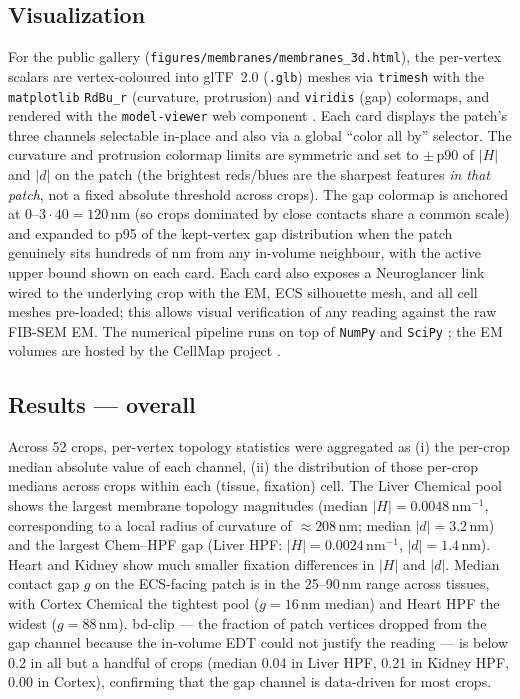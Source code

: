 \subsection*{Visualization}
For the public gallery (\texttt{figures/membranes/membranes\_3d.html}),
the per-vertex scalars are vertex-coloured into glTF~2.0 (\texttt{.glb})
meshes via \texttt{trimesh} \cite{DawsonHaggerty2019} with the
\texttt{matplotlib} \texttt{RdBu\_r} (curvature, protrusion) and
\texttt{viridis} (gap) colormaps, and rendered with the
\texttt{model-viewer} web component \cite{ModelViewer}. Each card displays the
patch's three channels selectable in-place and also via a global
``color all by'' selector. The curvature and protrusion colormap
limits are symmetric and set to $\pm$\,p90 of $|H|$ and $|d|$ on the
patch (the brightest reds/blues are the sharpest features
\emph{in that patch}, not a fixed absolute threshold across crops).
The gap colormap is anchored at 0--$3 \cdot 40 = 120$\,nm (so crops
dominated by close contacts share a common scale) and expanded to
p95 of the kept-vertex gap distribution when the patch genuinely
sits hundreds of nm from any in-volume neighbour, with the active
upper bound shown on each card. Each card also exposes a
Neuroglancer \cite{Neuroglancer} link wired to the underlying crop
with the EM, ECS silhouette mesh, and all cell meshes pre-loaded;
this allows visual verification of any reading against the raw
FIB-SEM EM. The numerical pipeline runs on top of
\texttt{NumPy} \cite{Harris2020} and \texttt{SciPy} \cite{Virtanen2020};
the EM volumes are hosted by the CellMap project
\cite{Heinrich2021, Xu2021}.

\subsection*{Results --- overall}

Across 52 crops, per-vertex topology statistics were aggregated as
(i) the per-crop median absolute value of each channel, (ii) the
distribution of those per-crop medians across crops within each
(tissue, fixation) cell. The Liver Chemical pool shows the largest
membrane topology magnitudes (median $|H| = 0.0048$\,nm$^{-1}$,
corresponding to a local radius of curvature of $\approx 208$\,nm;
median $|d| = 3.2$\,nm) and the largest Chem--HPF gap (Liver HPF:
$|H| = 0.0024$\,nm$^{-1}$, $|d| = 1.4$\,nm). Heart and Kidney show
much smaller fixation differences in $|H|$ and $|d|$. Median contact
gap $g$ on the ECS-facing patch is in the 25--90\,nm range across
tissues, with Cortex Chemical the tightest pool ($g = 16$\,nm
median) and Heart HPF the widest ($g = 88$\,nm). bd-clip --- the
fraction of patch vertices dropped from the gap channel because the
in-volume EDT could not justify the reading --- is below 0.2 in all
but a handful of crops (median 0.04 in Liver HPF, 0.21 in Kidney HPF,
0.00 in Cortex), confirming that the gap channel is data-driven for
most crops.

